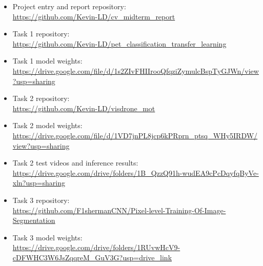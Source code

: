 \documentclass[11pt,a4paper]{article}
\begin{document}
\begin{itemize}
    \item Project entry and report repository: \\
    \url{https://github.com/Kevin-LD/cv_midterm_report}

    \item Task 1 repository: \\
    \url{https://github.com/Kevin-LD/pet_classification_transfer_learning}

    \item Task 1 model weights: \\
    \url{https://drive.google.com/file/d/1s2ZIvFHIIrooQfqziZymulcBspTyGJWn/view?usp=sharing}

    \item Task 2 repository: \\
    \url{https://github.com/Kevin-LD/visdrone_mot}

    \item Task 2 model weights: \\
    \url{https://drive.google.com/file/d/1VD7jnPL8jcp6kPRprn_ptsq_WHy5IRDW/view?usp=sharing}

    \item Task 2 test videos and inference results: \\
    \url{https://drive.google.com/drive/folders/1B_QzzQ91h-wudEA9cPcDqyfqByVe-xln?usp=sharing}

    \item Task 3 repository: \\
    \url{https://github.com/F1shermanCNN/Pixel-level-Training-Of-Image-Segmentation}

    \item Task 3 model weights: \\
    \url{https://drive.google.com/drive/folders/1RUvwHcV9-cDFWHC3W6JsZqqreM_GuV3G?usp=drive_link}
\end{itemize}
\end{document}
